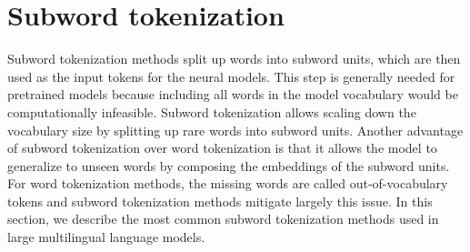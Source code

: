 












\section{Subword tokenization}

Subword tokenization methods split up words into subword units, which are then used as the input tokens for the neural models. This step is generally needed for pretrained models because including all words in the model vocabulary would be computationally infeasible. Subword tokenization allows scaling down the vocabulary size by splitting up rare words into subword units. Another advantage of subword tokenization over word tokenization is that it allows the model to generalize to unseen words by composing the embeddings of the subword units. For word tokenization methods, the missing words are called out-of-vocabulary tokens and subword tokenization methods mitigate largely this issue. In this section, we describe the most common subword tokenization methods used in large multilingual language models.

